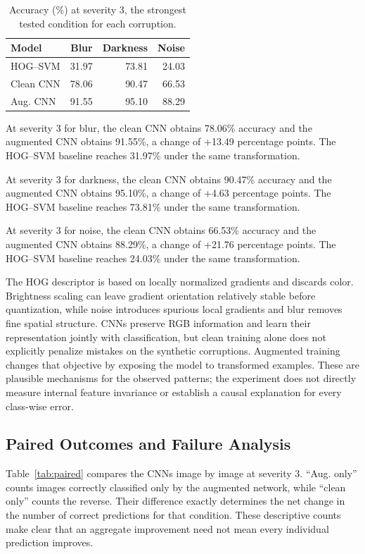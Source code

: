 \documentclass[conference]{IEEEtran}
\begin{document}
\begin{table}[t]\centering
\caption{Accuracy (\%) at severity 3, the strongest tested condition for each corruption.}\label{tab:severe}
\begin{tabular}{lrrr}\toprule
Model & Blur & Darkness & Noise\\\midrule
HOG--SVM & 31.97 & 73.81 & 24.03\\
Clean CNN & 78.06 & 90.47 & 66.53\\
Aug. CNN & 91.55 & 95.10 & 88.29\\\bottomrule
\end{tabular}\end{table}

At severity 3 for blur, the clean CNN obtains 78.06\% accuracy and the augmented CNN obtains 91.55\%, a change of +13.49 percentage points. The HOG--SVM baseline reaches 31.97\% under the same transformation.

At severity 3 for darkness, the clean CNN obtains 90.47\% accuracy and the augmented CNN obtains 95.10\%, a change of +4.63 percentage points. The HOG--SVM baseline reaches 73.81\% under the same transformation.

At severity 3 for noise, the clean CNN obtains 66.53\% accuracy and the augmented CNN obtains 88.29\%, a change of +21.76 percentage points. The HOG--SVM baseline reaches 24.03\% under the same transformation.

The HOG descriptor is based on locally normalized gradients and discards color. Brightness scaling can leave gradient orientation relatively stable before quantization, while noise introduces spurious local gradients and blur removes fine spatial structure. CNNs preserve RGB information and learn their representation jointly with classification, but clean training alone does not explicitly penalize mistakes on the synthetic corruptions. Augmented training changes that objective by exposing the model to transformed examples. These are plausible mechanisms for the observed patterns; the experiment does not directly measure internal feature invariance or establish a causal explanation for every class-wise error.

\subsection{Paired Outcomes and Failure Analysis}
Table~\ref{tab:paired} compares the CNNs image by image at severity 3. ``Aug. only'' counts images correctly classified only by the augmented network, while ``clean only'' counts the reverse. Their difference exactly determines the net change in the number of correct predictions for that condition. These descriptive counts make clear that an aggregate improvement need not mean every individual prediction improves.
\end{document}
